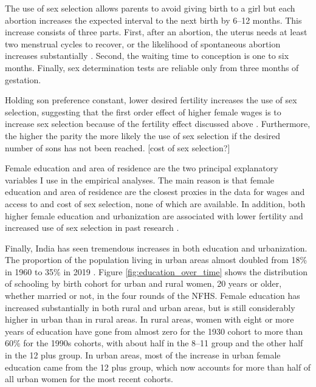 The use of sex selection allows parents to avoid giving birth to a girl but each
abortion increases the expected interval to the next birth by 6--12 months.
This increase consists of three parts. 
First, after an abortion, the uterus needs at least two menstrual cycles to recover, 
or the likelihood of spontaneous abortion increases substantially \citep{zhou00b}. 
Second, the waiting time to conception is one to six months. 
Finally, sex determination tests are reliable only from three months of gestation. 

Holding son preference constant, lower desired fertility increases the use of sex 
selection, suggesting that the first order effect of higher female wages is to increase 
sex selection because of the fertility effect discussed above 
\citep{Portner2015b,Jayachandran2017}.  
Furthermore, the higher the parity the more likely the use of sex selection if the 
desired number of sons has not been reached.
[cost of sex selection?]


Female education and area of residence are the two principal explanatory variables I use
in the empirical analyses.
The main reason is that female education and area of residence are the closest proxies in 
the data for wages and access to and cost of sex selection, none of which are available.
In addition, both higher female education and urbanization are associated with lower 
fertility and increased use of sex selection in past research
\citep{das_gupta97,dreze01,bhat03,retherford03b,Guilmoto2009a,Portner2015b,Jayachandran2017}.

Finally, India has seen tremendous increases in both education and urbanization.
The proportion of the population living in urban areas almost doubled from 18\%
in 1960 to 35\% in 2019 \citep{United-Nations2019}.
Figure \ref{fig:education_over_time} shows the distribution of schooling by birth 
cohort for urban and rural women, 20 years or older, whether married or not, in the 
four rounds of the NFHS.
Female education has increased substantially in both rural and urban areas,
but is still considerably higher in urban than in rural areas.
In rural areas, women with eight or more years of education have gone from almost zero for 
the 1930 cohort to more than 60\% for the 1990s cohorts, with about half in the 8--11 
group and the other half in the 12 plus group.
In urban areas, most of the increase in urban female education came from the 12 plus 
group, which now accounts for more than half of all urban women for the most recent cohorts.

